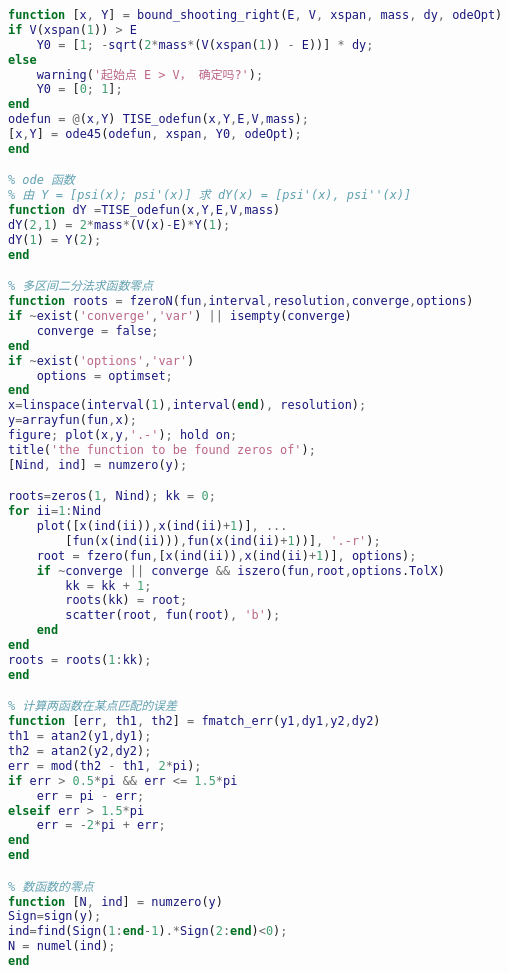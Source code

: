 \begin{lstlisting}[language=matlab, caption=bndShoot.m]
% 从右边入射
function [x, Y] = bound_shooting_right(E, V, xspan, mass, dy, odeOpt)
if V(xspan(1)) > E
    Y0 = [1; -sqrt(2*mass*(V(xspan(1)) - E))] * dy;
else
    warning('起始点 E > V， 确定吗?');
    Y0 = [0; 1];
end
odefun = @(x,Y) TISE_odefun(x,Y,E,V,mass);
[x,Y] = ode45(odefun, xspan, Y0, odeOpt);
end

% ode 函数
% 由 Y = [psi(x); psi'(x)] 求 dY(x) = [psi'(x), psi''(x)]
function dY =TISE_odefun(x,Y,E,V,mass)
dY(2,1) = 2*mass*(V(x)-E)*Y(1);
dY(1) = Y(2);
end

% 多区间二分法求函数零点
function roots = fzeroN(fun,interval,resolution,converge,options)
if ~exist('converge','var') || isempty(converge)
    converge = false;
end
if ~exist('options','var')
    options = optimset;
end
x=linspace(interval(1),interval(end), resolution);
y=arrayfun(fun,x);
figure; plot(x,y,'.-'); hold on;
title('the function to be found zeros of');
[Nind, ind] = numzero(y);

roots=zeros(1, Nind); kk = 0;
for ii=1:Nind
    plot([x(ind(ii)),x(ind(ii)+1)], ...
        [fun(x(ind(ii))),fun(x(ind(ii)+1))], '.-r');
    root = fzero(fun,[x(ind(ii)),x(ind(ii)+1)], options);
    if ~converge || converge && iszero(fun,root,options.TolX)
        kk = kk + 1;
        roots(kk) = root;
        scatter(root, fun(root), 'b');
    end
end
roots = roots(1:kk);
end

% 计算两函数在某点匹配的误差
function [err, th1, th2] = fmatch_err(y1,dy1,y2,dy2)
th1 = atan2(y1,dy1);
th2 = atan2(y2,dy2);
err = mod(th2 - th1, 2*pi);
if err > 0.5*pi && err <= 1.5*pi
    err = pi - err;
elseif err > 1.5*pi
    err = -2*pi + err;
end
end

% 数函数的零点
function [N, ind] = numzero(y)
Sign=sign(y);
ind=find(Sign(1:end-1).*Sign(2:end)<0);
N = numel(ind);
end
\end{lstlisting}
